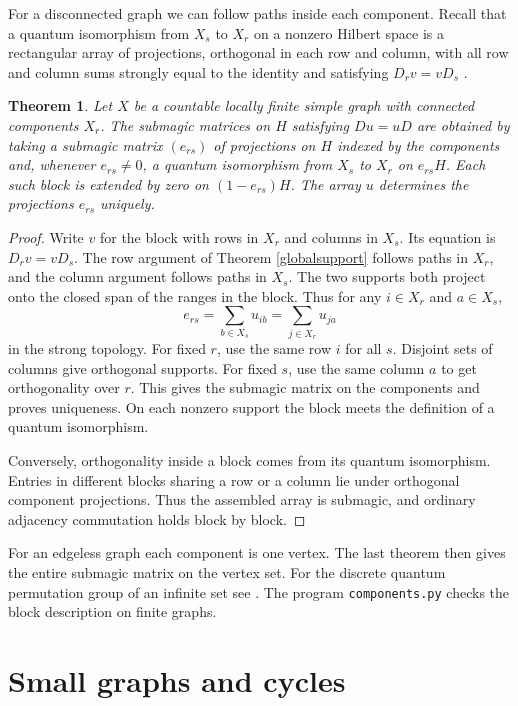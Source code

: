 \documentclass[11pt,a4paper]{article}
\newtheorem{thm}{Theorem}[section]
\begin{document}
For a disconnected graph we can follow paths inside each component. Recall that a quantum isomorphism from $X_s$ to $X_r$ on a nonzero Hilbert space is a rectangular array of projections, orthogonal in each row and column, with all row and column sums strongly equal to the identity and satisfying $D_rv=vD_s$ \cite{rv}.

\begin{thm}\label{componentsupport}
Let $X$ be a countable locally finite simple graph with connected components $X_r$. The submagic matrices on $H$ satisfying $Du=uD$ are obtained by taking a submagic matrix $(e_{rs})$ of projections on $H$ indexed by the components and, whenever $e_{rs}\ne0$, a quantum isomorphism from $X_s$ to $X_r$ on $e_{rs}H$. Each such block is extended by zero on $(1-e_{rs})H$. The array $u$ determines the projections $e_{rs}$ uniquely.
\end{thm}
\begin{proof}
Write $v$ for the block with rows in $X_r$ and columns in $X_s$. Its equation is $D_rv=vD_s$. The row argument of Theorem \ref{globalsupport} follows paths in $X_r$, and the column argument follows paths in $X_s$. The two supports both project onto the closed span of the ranges in the block. Thus for any $i\in X_r$ and $a\in X_s$,
\[
 e_{rs}=\sum_{b\in X_s}u_{ib}=\sum_{j\in X_r}u_{ja}
\]
in the strong topology. For fixed $r$, use the same row $i$ for all $s$. Disjoint sets of columns give orthogonal supports. For fixed $s$, use the same column $a$ to get orthogonality over $r$. This gives the submagic matrix on the components and proves uniqueness. On each nonzero support the block meets the definition of a quantum isomorphism.

Conversely, orthogonality inside a block comes from its quantum isomorphism. Entries in different blocks sharing a row or a column lie under orthogonal component projections. Thus the assembled array is submagic, and ordinary adjacency commutation holds block by block.
\end{proof}

For an edgeless graph each component is one vertex. The last theorem then gives the entire submagic matrix on the vertex set. For the discrete quantum permutation group of an infinite set see \cite{voigt}. The program \texttt{components.py} checks the block description on finite graphs.

\section{Small graphs and cycles}\label{cycle}
\end{document}
